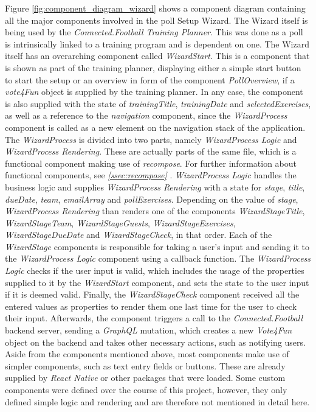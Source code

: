 Figure \ref{fig:component_diagram_wizard} shows a component diagram containing all the major components involved in the poll Setup Wizard. The Wizard itself is being used by the \textit{Connected.Football Training Planner}. This was done as a poll is intrinsically linked to a training program and is dependent on one.
\newline
The Wizard itself has an overarching component called \textit{WizardStart}. This is a component that is shown as part of the training planner, displaying either a simple start button to start the setup or an overview in form of the component \textit{PollOverview}, if a \textit{vote4Fun} object is supplied by the training planner. In any case, the component is also supplied with the state of \textit{trainingTitle}, \textit{trainingDate} and \textit{selectedExercises}, as well as a reference to the \textit{navigation} component, since the \textit{WizardProcess} component is called as a new element on the navigation stack of the application.
\newline
The \textit{WizardProcess} is divided into two parts, namely \textit{WizardProcess Logic} and \textit{WizardProcess Rendering}. These are actually parts of the same file, which is a functional component making use of \textit{recompose}. For further information about functional components, see \textit{\ref{ssec:recompose} }.
\newline
\textit{WizardProcess Logic} handles the business logic and supplies \textit{WizardProcess Rendering} with a state for \textit{stage}, \textit{title}, \textit{dueDate}, \textit{team}, \textit{emailArray} and \textit{pollExercises}. Depending on the value of \textit{stage}, \textit{WizardProcess Rendering} than renders one of the components \textit{WizardStageTitle}, \textit{WizardStageTeam}, \textit{WizardStageGuests}, \textit{WizardStageExercises}, \textit{WizardStageDueDate} and \textit{WizardStageCheck}, in that order.
\newline
Each of the \textit{WizardStage} components is responsible for taking a user's input and sending it to the \textit{WizardProcess Logic} component using a callback function. The \textit{WizardProcess Logic} checks if the user input is valid, which includes the usage of the properties supplied to it by the \textit{WizardStart} component, and sets the state to the user input if it is deemed valid.
\newline
Finally, the \textit{WizardStageCheck} component received all the entered values as properties to render them one last time for the user to check their input. Afterwards, the component triggers a call to the \textit{Connected.Football} backend server, sending a \textit{GraphQL} mutation, which creates a new \textit{Vote4Fun} object on the backend and takes other necessary actions, such as notifying users.
\newline
Aside from the components mentioned above, most components make use of simpler components, such as text entry fields or buttons. These are already supplied by \textit{React Native} or other packages that were loaded. Some custom components were defined over the course of this project, however, they only defined simple logic and rendering and are therefore not mentioned in detail here.